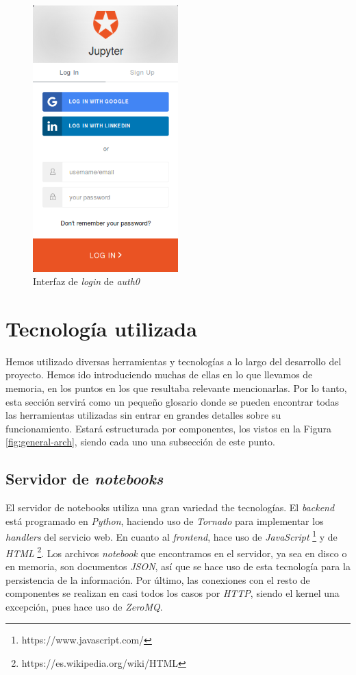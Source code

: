 \documentclass[11pt,spanish,listoffigures]{tfgetsinf}
\begin{document}
\begin{figure}[H]
	\centering
  	\includegraphics[width=0.5\textwidth]{login.png}
  	\caption{Interfaz de \textit{login} de \textit{auth0}}
  	\label{fig:login}
\end{figure}



\section{Tecnología utilizada}
\label{sec:tecno-utilizada}

Hemos utilizado diversas herramientas y tecnologías a lo largo del desarrollo del proyecto. Hemos ido introduciendo muchas de ellas en lo que llevamos de memoria, en los puntos en los que resultaba relevante mencionarlas. Por lo tanto, esta sección servirá como un pequeño glosario donde se pueden encontrar todas las herramientas utilizadas sin entrar en grandes detalles sobre su funcionamiento. Estará estructurada por componentes, los vistos en la Figura \ref{fig:general-arch}, siendo cada uno una subsección de este punto.


\subsection{Servidor de \textit{notebooks}}
\label{subsec:tecno-server}

El servidor de notebooks utiliza una gran variedad the tecnologías. El \textit{backend} está programado en \textit{Python}, haciendo uso de \textit{Tornado} para implementar los \textit{handlers} del servicio web. En cuanto al \textit{frontend}, hace uso de \textit{JavaScript} \footnote{https://www.javascript.com/} y de \textit{HTML} \footnote{https://es.wikipedia.org/wiki/HTML}. Los archivos \textit{notebook} que encontramos en el servidor, ya sea en disco o en memoria, son documentos \textit{JSON}, así que se hace uso de esta tecnología para la persistencia de la información. Por último, las conexiones con el resto de componentes se realizan en casi todos los casos por \textit{HTTP}, siendo el kernel una excepción, pues hace uso de \textit{ZeroMQ}. 
\end{document}
